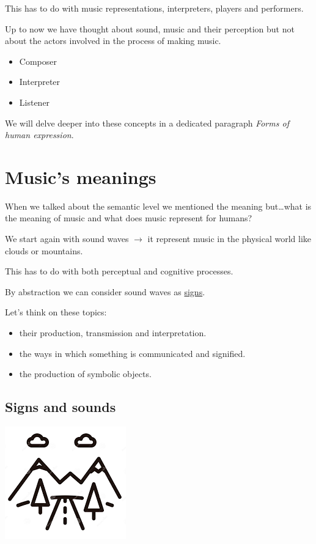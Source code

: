 This has to do with music representations, interpreters, players and performers.

Up to now we have thought about sound, music and their perception but not about the actors involved in the process of making music.

\begin{itemize}
\tightlist
\item Composer
\item Interpreter
\item Listener
\end{itemize}

We will delve deeper into these concepts in a dedicated paragraph \textit{Forms of human expression}.

\section{Music's meanings }\label{musics-meanings}

When we talked about the semantic level we mentioned the meaning but\ldots what is the meaning of music and what does music represent for humans?

We start again with sound waves \(\rightarrow\) it represent music in the physical world like clouds or mountains.

This has to do with both perceptual and cognitive processes.

By abstraction we can consider sound waves as \href{https://github.com/musicaecodice/EMC/blob/main/1_premises/suoni/segno1.mp4}{signs}.

Let's think on these topics: 

\begin{itemize}
\tightlist
\item their production, transmission and interpretation. 
\item the ways in which something is communicated and signified. 
\item the production of symbolic objects.
\end{itemize}

\subsection{Signs and sounds }\label{signs-and-sounds}

\begin{center}
\includegraphics[scale=0.45]{../img/montagne.png}
\end{center}

